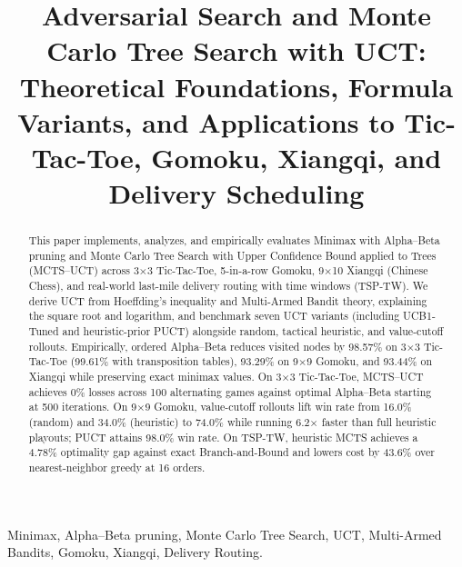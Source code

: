 \documentclass[conference]{IEEEtran}
\begin{document}
\title{Adversarial Search and Monte Carlo Tree Search with UCT:\\
Theoretical Foundations, Formula Variants, and Applications to Tic-Tac-Toe, Gomoku, Xiangqi, and Delivery Scheduling}

\author{
}

\maketitle

\begin{abstract}
This paper implements, analyzes, and empirically evaluates Minimax with Alpha--Beta pruning and Monte Carlo Tree Search with Upper Confidence Bound applied to Trees (MCTS--UCT) across 3$\times$3 Tic-Tac-Toe, 5-in-a-row Gomoku, 9$\times$10 Xiangqi (Chinese Chess), and real-world last-mile delivery routing with time windows (TSP-TW). We derive UCT from Hoeffding's inequality and Multi-Armed Bandit theory, explaining the square root and logarithm, and benchmark seven UCT variants (including UCB1-Tuned and heuristic-prior PUCT) alongside random, tactical heuristic, and value-cutoff rollouts. Empirically, ordered Alpha--Beta reduces visited nodes by 98.57\% on 3$\times$3 Tic-Tac-Toe (99.61\% with transposition tables), 93.29\% on 9$\times$9 Gomoku, and 93.44\% on Xiangqi while preserving exact minimax values. On 3$\times$3 Tic-Tac-Toe, MCTS--UCT achieves 0\% losses across 100 alternating games against optimal Alpha--Beta starting at 500 iterations. On 9$\times$9 Gomoku, value-cutoff rollouts lift win rate from 16.0\% (random) and 34.0\% (heuristic) to 74.0\% while running 6.2$\times$ faster than full heuristic playouts; PUCT attains 98.0\% win rate. On TSP-TW, heuristic MCTS achieves a 4.78\% optimality gap against exact Branch-and-Bound and lowers cost by 43.6\% over nearest-neighbor greedy at 16 orders.
\end{abstract}

\begin{IEEEkeywords}
Minimax, Alpha--Beta pruning, Monte Carlo Tree Search, UCT, Multi-Armed Bandits, Gomoku, Xiangqi, Delivery Routing.
\end{IEEEkeywords}

\end{document}
